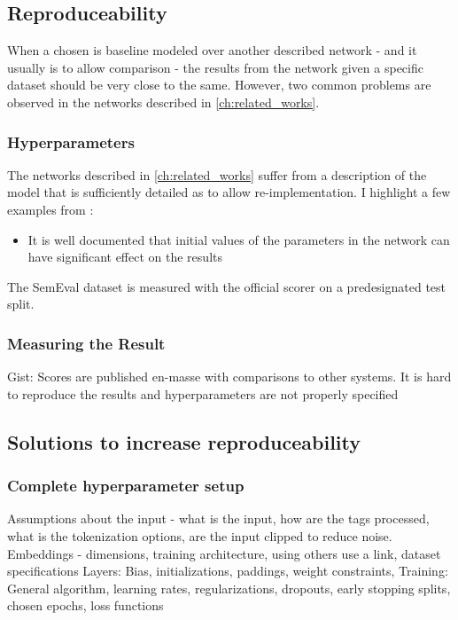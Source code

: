 \subsection{Reproduceability}
 
When a chosen is baseline modeled over another described network - and it usually is to allow comparison -  the results from the network given a specific dataset should be very close to the same. However, two common problems are observed in the networks described in \autoref{ch:related_works}.

\subsubsection{Hyperparameters}
 The networks described in \autoref{ch:related_works} suffer from a description of the model that is sufficiently detailed as to allow re-implementation. I highlight a few examples from \cite{re_cnn}:

\begin{itemize}
    \item It is well documented that initial values of the parameters in the network can have significant effect on the results 


\end{itemize}


 The SemEval dataset is measured with the official scorer on a predesignated test split.    

\subsubsection{Measuring the Result}

Gist: Scores are published en-masse with comparisons to other systems. It is hard to reproduce the results and hyperparameters are not properly specified

\subsection{Solutions to increase reproduceability}

\subsubsection{Complete hyperparameter setup}

Assumptions about the input - what is the input, how are the tags processed, what is the tokenization options, are the input clipped to reduce noise.
Embeddings - dimensions, training architecture, using others use a link, dataset specifications
Layers: Bias, initializations, paddings, weight constraints, 
Training: General algorithm, learning rates, regularizations, dropouts, early stopping splits, chosen epochs, loss functions

